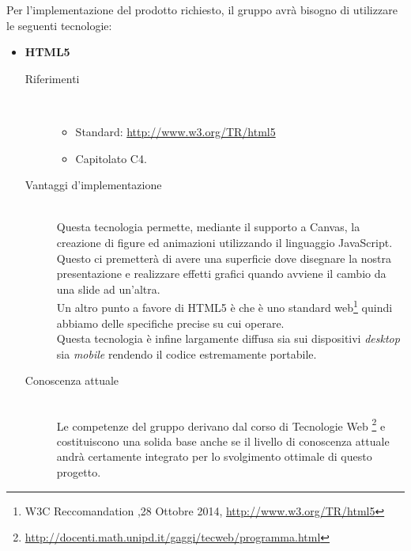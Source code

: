 Per l’implementazione del prodotto richiesto, il gruppo avrà bisogno di utilizzare le seguenti tecnologie:
\begin{itemize}
	\item \textbf{HTML5}
	\begin{description}
		\item[Riferimenti] \hfill \\
		\begin{itemize}
			\item Standard: \url{http://www.w3.org/TR/html5}
			\item Capitolato C4.
		\end{itemize}
		\item[Vantaggi d'implementazione] \hfill \\ Questa tecnologia permette, mediante il supporto a Canvas, la creazione di figure ed animazioni  utilizzando il linguaggio JavaScript. Questo ci premetterà di avere una superficie dove disegnare la nostra presentazione e realizzare effetti grafici quando avviene il cambio da una slide ad un’altra. \\ Un altro punto a favore di HTML5 è che è uno standard web\footnote{W3C Reccomandation ,28 Ottobre 2014, \url{http://www.w3.org/TR/html5}} quindi abbiamo delle specifiche precise su cui operare. \\ Questa tecnologia è infine largamente diffusa sia sui dispositivi \textit{desktop} sia \textit{mobile} rendendo il codice estremamente portabile.

	\item[Conoscenza attuale] \hfill \\ Le competenze del gruppo \GRUPPO{}  derivano dal corso di Tecnologie Web \footnote{\url{http://docenti.math.unipd.it/gaggi/tecweb/programma.html}} e costituiscono una solida base anche se il livello di conoscenza attuale andrà certamente integrato per lo svolgimento ottimale di questo progetto.


\end{description}
\end{itemize}
